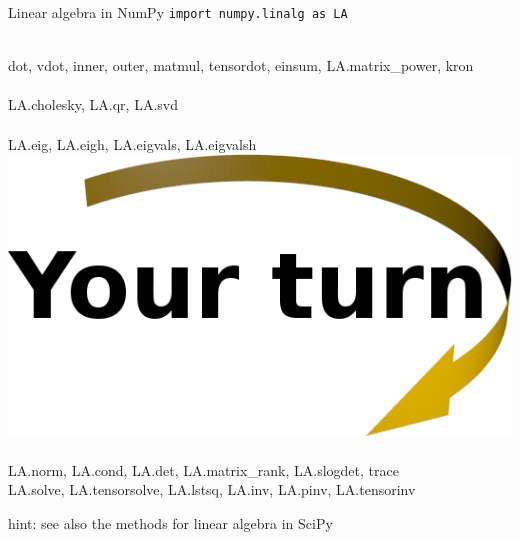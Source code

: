\documentclass[svgnames]{beamer}
\begin{document}
\begin{frame}[fragile]{Linear algebra in NumPy}
 \texttt{import numpy.linalg as LA}

 \vspace{0.3truecm}
 \\
 {\small dot, vdot, inner, outer, matmul, tensordot, einsum, LA.matrix\_power,
 kron}\\[0.2truecm]
 \\
 {\small LA.cholesky, LA.qr, LA.svd}\\[0.2truecm]
 \\[-1.32truecm]
 \alert{\small LA.eig, LA.eigh, LA.eigvals, LA.eigvalsh}\qquad
 \includegraphics[width=3truecm]{yourturn}\\[0.2truecm]
 \\
 {\small LA.norm, LA.cond, LA.det, LA.matrix\_rank, LA.slogdet,
 trace}\\[0.2truecm]
 {\small LA.solve, LA.tensorsolve, LA.lstsq, LA.inv, LA.pinv, LA.tensorinv}

 \vspace{0.6truecm}
 hint: see also the methods for linear algebra in SciPy
\end{frame}
\end{document}
